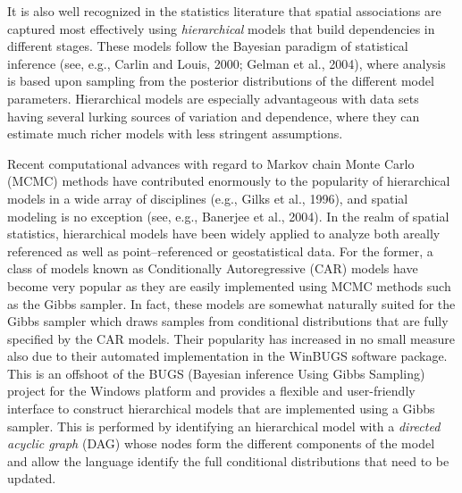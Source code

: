 \documentclass[a4paper]{article}
\newcommand{\pkg}[1]{{\normalfont\fontseries{b}\selectfont #1}}
\begin{document}
It is also well recognized in the statistics literature that spatial
associations are captured most effectively using \emph{hierarchical}
models that build dependencies in different stages. These models
follow the Bayesian paradigm of statistical inference (see, e.g.,
Carlin and Louis, 2000; Gelman et al., 2004), where analysis is based upon
sampling from the posterior distributions of the different model
parameters. Hierarchical models are especially advantageous with
data sets having several lurking sources of variation and
dependence, where they can estimate much richer models with less
stringent assumptions.

Recent computational advances with regard to Markov chain Monte
Carlo (MCMC) methods have contributed enormously to the popularity
of hierarchical models in a wide array of disciplines (e.g.,
Gilks et al., 1996), and spatial modeling is no exception (see, e.g.,
Banerjee et al., 2004). In the realm of spatial statistics, hierarchical
models have been widely applied to analyze both areally referenced
as well as point--referenced or geostatistical data. For the
former, a class of models known as Conditionally Autoregressive
(CAR) models have become very popular as they are easily
implemented using MCMC methods such as the Gibbs sampler. In fact,
these models are somewhat naturally suited for the Gibbs sampler
which draws samples from conditional distributions that are fully
specified by the CAR models. Their popularity has increased in no
small measure also due to their automated implementation in the
\pkg{WinBUGS} software package. This is an offshoot of the
\pkg{BUGS} (Bayesian inference Using Gibbs Sampling) project for the Windows platform and provides a flexible and user-friendly interface to construct hierarchical models
that are implemented using a Gibbs sampler. This is performed by
identifying an hierarchical model with a \emph{directed acyclic
graph} (DAG) whose nodes form the different components of the
model and allow the language identify the full conditional
distributions that need to be updated.
\end{document}

